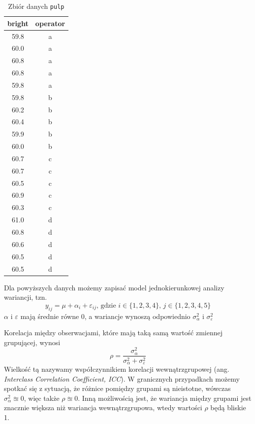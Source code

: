 \documentclass[12pt]{mwbk}
\theoremstyle{plain}
\theoremstyle{definition}
\theoremstyle{remark}
\newcommand\zrodlo[1]{\par\vspace{-3mm}{\small\textit{Źródło: }#1 }}
\begin{document}
\begin{table}[!htbp]
	\centering
	
	
	\begin{tabular}{|c|c|}
		\hline
		bright & operator\\
		\hline
		59.8 & a\\
		\hline
		60.0 & a\\
		\hline
		60.8 & a\\
		\hline
		60.8 & a\\
		\hline
		59.8 & a\\
		\hline
		59.8 & b\\
		\hline
		60.2 & b\\
		\hline
		60.4 & b\\
		\hline
		59.9 & b\\
		\hline
		60.0 & b\\
		\hline
		60.7 & c\\
		\hline
		60.7 & c\\
		\hline
		60.5 & c\\
		\hline
		60.9 & c\\
		\hline
		60.3 & c\\
		\hline
		61.0 & d\\
		\hline
		60.8 & d\\
		\hline
		60.6 & d\\
		\hline
		60.5 & d\\
		\hline
		60.5 & d\\
		\hline
	\end{tabular}
	\caption{Zbiór danych \texttt{pulp}}
	\label{tab:pulp}
	\zrodlo{\cite{pulp}}
\end{table}


Dla powyższych danych możemy zapisać model jednokierunkowej analizy wariancji, tzn.
\begin{equation}
y_{ij}=\mu+\alpha_i+\varepsilon_{ij}  \text{, gdzie }i\in\lbrace{1,2,3,4\rbrace} \text{, } j\in \lbrace{1,2,3,4,5\rbrace}
\end{equation} $\alpha$ i $\varepsilon$ mają średnie równe 0, a wariancje wynoszą odpowiednio $\sigma_{\alpha}^2$ i $\sigma_{\varepsilon}^2$

Korelacja między obserwacjami, które mają taką samą wartość zmiennej grupującej, wynosi $$\rho = \frac{\sigma^2_{\alpha}}{\sigma_{\alpha}^2+\sigma_{\varepsilon}^2} $$Wielkość tą nazywamy współczynnikiem korelacji wewnątrzgrupowej (ang. \textit{Interclass Correlation Coefficient, ICC}). W granicznych przypadkach możemy spotkać się z sytuacją, że różnice pomiędzy grupami są nieistotne, wówczas $\sigma^2_{\alpha} \approxeq 0$, więc także $\rho \approxeq 0$. Inną możliwością jest, że wariancja między grupami jest znacznie większa niż wariancja wewnątrzgrupowa, wtedy wartości $\rho$ będą bliskie 1.
\end{document}
